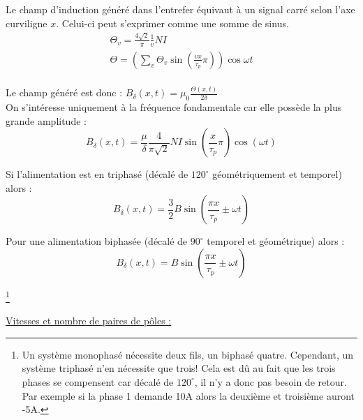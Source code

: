 \documentclass[../main.tex]{subfiles}
\begin{document}
Le champ d'induction généré dans l'entrefer équivaut à un signal carré selon l'axe curviligne $x$. Celui-ci peut s'exprimer comme une somme de sinus. \begin{equation}
    \begin{gathered}
        \Theta_v = \frac{4 \sqrt{2}}{\pi} \frac{1}{v} NI\\
        \Theta = (\sum_v \Theta_v \sin(\frac{vx}{\tau_p}\pi))\cos{\omega t}\\
    \end{gathered}
\end{equation}

Le champ généré est donc : $B_\delta(x,t) = \mu_0 \frac{\Theta(x,t)}{2\delta}$\\

On s'intéresse uniquement à la fréquence fondamentale car elle possède la plus grande amplitude : \begin{equation}
    B_\delta (x,t) = \frac{\mu}{\delta} \frac{4}{\pi \sqrt{2}} NI \sin(\frac{x}{\tau_p}\pi) \cos(\omega t)
\end{equation}

Si l'alimentation est en triphasé (décalé de $120^\circ$ géométriquement et temporel) alors : \begin{equation}
    B_\delta(x,t) = \frac{3}{2} B \sin(\frac{\pi x}{\tau_p}\pm \omega t)
\end{equation}

Pour une alimentation biphasée (décalé de $90^\circ$ temporel et géométrique) alors : \begin{equation}
    B_\delta(x,t) = B \sin(\frac{\pi x}{\tau_p}\pm \omega t)
\end{equation}

\footnote{Un système monophasé nécessite deux fils, un biphasé quatre. Cependant, un système triphasé n'en nécessite que trois! Cela est dû au fait que les trois phases se compensent car décalé de $120^\circ$, il n'y a donc pas besoin de retour. Par exemple si la phase 1 demande 10A alors la deuxième et troisième auront -5A.}


\quad \underline{Vitesses et nombre de paires de pôles :}\\
\end{document}
